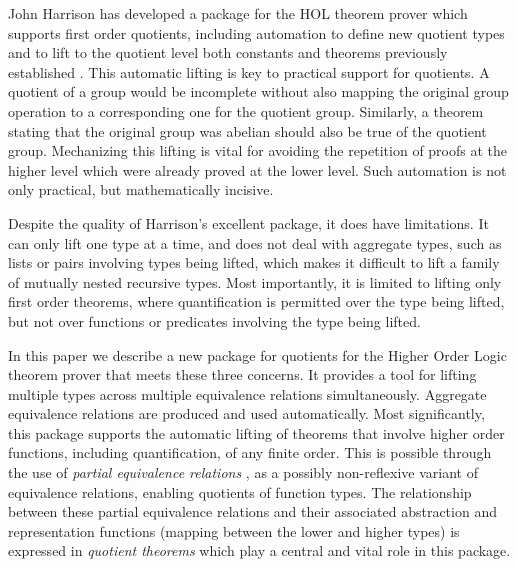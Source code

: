 \documentclass[envcountsame,runningheads]{llncs}
\newcommand{\quotient}{partial equivalence}
\begin{document}
John Harrison has developed a package for the
HOL
theorem prover which supports first order quotients,
including automation to define new quotient types
and to lift to the quotient level both constants
and theorems previously established
\cite{Har98}.
%
This automatic lifting is key to practical support for quotients.
A quotient of a group
would be incomplete without also mapping the original group
operation to a corresponding one for the quotient group.
Similarly, a theorem stating that the original group was abelian
should also be true of the quotient group.
Mechanizing this lifting is vital for avoiding the repetition of proofs
at the higher level which were already proved at the lower level.
Such automation is not only practical, but mathematically incisive.

Despite the quality of Harrison's excellent package, it does have
limitations.  It can only lift one type at a time,
and does not deal with aggregate types, such as lists or pairs
involving types being lifted,
which makes it difficult to lift a family of mutually nested recursive types.
Most importantly, it is limited to lifting only first order theorems,
where
quantification is permitted over the
type being lifted, but not over functions or predicates involving the type
being lifted.

In this paper we describe a new package for quotients for the Higher Order
Logic theorem prover that meets these three concerns.  It provides a tool
for lifting multiple types across multiple equivalence relations simultaneously.
Aggregate equivalence relations are produced and used automatically.
Most significantly, this package supports the automatic
lifting of theorems that involve higher order functions, including
quantification, of any finite order.
This is possible through the use of
{\it \quotient{} relations}
\cite{Rob89},
as a possibly non-reflexive variant of
equivalence relations, enabling
quotients
of function types.
The relationship between these \quotient{} relations and their
associated abstraction and representation functions (mapping between the
lower and higher types)
is expressed in {\it quotient theorems\/} which
play a central and vital role in this package.
\end{document}
